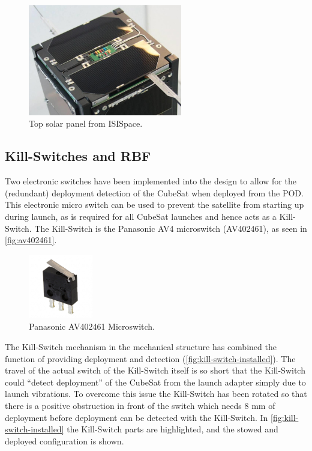\begin{figure}[!ht]
    \begin{center}
        \includegraphics[width=0.6\textwidth]{figures/isis-top-solar-panel}
        \caption{Top solar panel from ISISpace.}
        \label{fig:top-solar-panel}
    \end{center}
\end{figure}

\subsection{Kill-Switches and RBF}

Two electronic switches have been implemented into the design to allow for the (redundant) deployment detection of the CubeSat when deployed from the POD. This electronic micro switch can be used to prevent the satellite from starting up during launch, as is required for all CubeSat launches and hence acts as a Kill-Switch. The Kill-Switch is the Panasonic AV4 microswitch (AV402461), as seen in \autoref{fig:av402461}.

\begin{figure}[!ht]
    \begin{center}
        \includegraphics[width=0.25\textwidth]{figures/av402461}
        \caption{Panasonic AV402461 Microswitch.}
        \label{fig:av402461}
    \end{center}
\end{figure}

The Kill-Switch mechanism in the mechanical structure has combined the function of providing deployment and detection (\autoref{fig:kill-switch-installed}). The travel of the actual switch of the Kill-Switch itself is so short that the Kill-Switch could ``detect deployment'' of the CubeSat from the launch adapter simply due to launch vibrations. To overcome this issue the Kill-Switch has been rotated so that there is a positive obstruction in front of the switch which needs 8 mm of deployment before deployment can be detected with the Kill-Switch. In \autoref{fig:kill-switch-installed} the Kill-Switch parts are highlighted, and the stowed and deployed configuration is shown.

